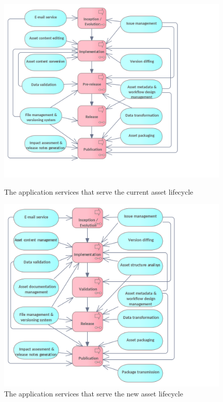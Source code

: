 	\begin{figure}[h]
		\centering
		\begin{minipage}{0.485\textwidth}
			\centering
			\includegraphics[width=1.3\textwidth]{images/application/Application Services (current).png}
			\caption{The application services that serve the current asset lifecycle}
			\label{fig:application-current}
		\end{minipage}\hfill
		\begin{minipage}{0.485\textwidth}
			\centering
			\includegraphics[width=1.3\textwidth]{images/application/Application Services (new).png}
			\caption{The application services that serve the new asset lifecycle}
			\label{fig:application-new}
		\end{minipage}
	\end{figure}
	
